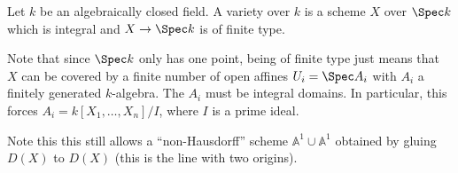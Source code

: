 Let $k$ be an algebraically closed field. A variety over $k$ is a scheme $X$
over $\Spec k$ which is integral and $X\to \Spec k$ is of finite type.

Note that since $\Spec k$ only has one point, being of finite type just means
that $X$ can be covered by a finite number of open affines $U_i = \Spec A_i$ with
$A_i$ a finitely generated $k$-algebra. The $A_i$ must be integral domains.
In particular, this forces $A_i = k[X_1, \ldots, X_n]/I$, where $I$ is a prime
ideal.

Note this this still allows a \enquote{non-Hausdorff} scheme $\mathbb{A}^1\cup \mathbb{A}^1$
obtained by gluing $D(X)$ to $D(X)$ (this is the line with two origins).
